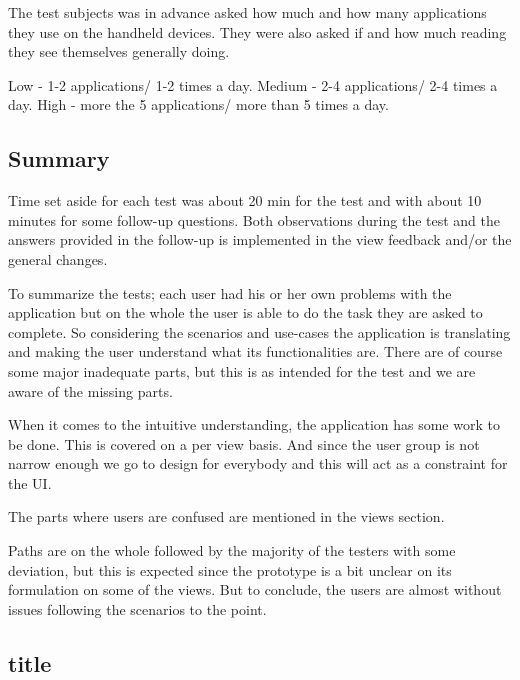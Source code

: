 {\begin{table}[H]
\begin{center}
\begin{tabular}{ | l | l | l | l |}
		\end{tabular}
	\end{center}
\end{table}

The test subjects was in advance  asked how much and how many applications they use on the handheld devices. They were also asked if and how much reading they see themselves generally doing.

Low - 1-2 applications/ 1-2 times a day.
Medium - 2-4 applications/ 2-4 times a day.
High - more the 5 applications/ more than 5 times a day.


\subsection{Summary}
Time set aside for each test was about 20 min for the test and with about 10 minutes for some follow-up questions. Both observations during the test and the answers provided in the follow-up is implemented in the view feedback and/or the general changes.

To summarize the tests; each user had his or her own problems with the application but on the whole the user is able to do the task they are asked to complete. So considering the scenarios and use-cases the application is translating and making the user understand what its functionalities are. There are of course some major inadequate parts, but this is as intended for the test and we are aware of the missing parts.

When it comes to the intuitive understanding, the application has some work to be done. This is covered on a per view basis. And since the user group is not narrow enough we go to design for everybody and this will act as a constraint for the UI. 

The parts where users are confused are mentioned in the views section.

Paths are on the whole followed by the majority of the testers with some deviation, but this is expected since the prototype is a bit unclear on its formulation on some of the views. But to conclude, the users are almost without issues following the scenarios to the point.

\subsection{title}
\renewcommand{\arraystretch}{2}%
\begin{center}
	\begin{longtable}{ | p{4cm} | p{3cm} | p{9cm}|}
		

\end{longtable}
\end{center}}
